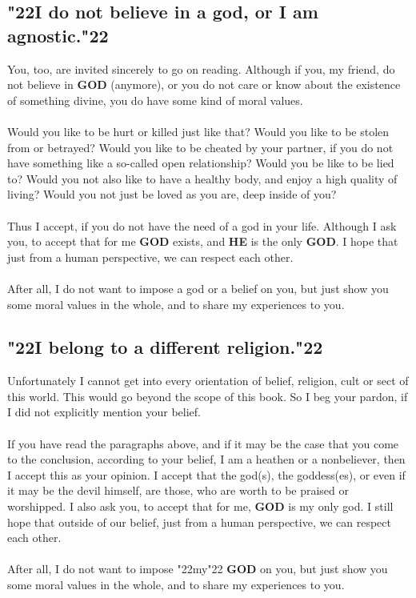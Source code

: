 \documentclass[12pt,a5paper]{article}
\newcommand{\God}[0]{\textbf{GOD}}
\newcommand{\He}[0]{\textbf{HE}}
\newcommand{\q}[1]{\char"22{#1}\char"22 }
\begin{document}
	\subsection{\q{I do not believe in a god, or I am agnostic.}}
		You,
		too,
		are invited sincerely to go on reading.
		Although if you,
		my friend,
		do not believe in {\God} (anymore),
		or you do not care or know about the existence of something divine,
		you do have some kind of moral values.
		\\
		\\
		Would you like to be hurt or killed just like that?
		Would you like to be stolen from or betrayed?
		Would you like to be cheated by your partner,
		if you do not have something like a so-called open relationship?
		Would you be like to be lied to?
		Would you not also like to have a healthy body,
		and enjoy a high quality of living?
		Would you not just be loved as you are,
		deep inside of you?
		\\
		\\
		Thus I accept,
		if you do not have the need of a god in your life.
		Although I ask you,
		to accept that for me {\God} exists,
		and {\He} is the only {\God}.
		I hope that just from a human perspective,
		we can respect each other.
		\\
		\\
		After all,
		I do not want to impose a god or a belief on you,
		but just show you some moral values in the whole,
		and to share my experiences to you.
		
		
	\subsection{\q{I belong to a different religion.}}
		Unfortunately I cannot get into every orientation of belief,
		religion, cult or sect of this world.
		This would go beyond the scope of this book.
		So I beg your pardon,
		if I did not explicitly mention your belief.
		\\
		\\
		If you have read the paragraphs above,
		and if it may be the case that you come to the conclusion,
		according to your belief,
		I am a heathen or a nonbeliever,
		then I accept this as your opinion.
		I accept that the god(s),
		the goddess(es),
		or even if it may be the devil himself,
		are those,
		who are worth to be praised or worshipped.
		I also ask you,
		to accept that for me,
		{\God} is my only god.
		I still hope that outside of our belief,
		just from a human perspective,
		we can respect each other.
		\\
		\\
		After all,
		I do not want to impose \q{my} {\God} on you,
		but just show you some moral values in the whole,
		and to share my experiences to you.
		
\end{document}
